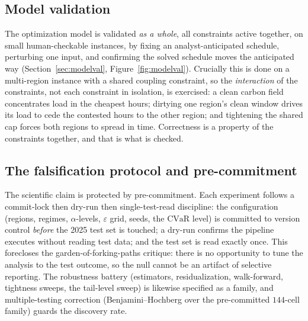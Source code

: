 \documentclass[12pt]{article}
\newcommand{\CVaR}{\mathrm{CVaR}}
\begin{document}
\subsection{Model validation}
The optimization model is validated \emph{as a whole}, all constraints active
together, on small human-checkable instances, by fixing an analyst-anticipated
schedule, perturbing one input, and confirming the solved schedule moves the
anticipated way (Section~\ref{sec:modelval}, Figure~\ref{fig:modelval}). Crucially
this is done on a multi-region instance with a shared coupling constraint, so the
\emph{interaction} of the constraints, not each constraint in isolation, is exercised:
a clean carbon field concentrates load in the cheapest hours; dirtying one region's
clean window drives its load to cede the contested hours to the other region; and
tightening the shared cap forces both regions to spread in time. Correctness is a
property of the constraints together, and that is what is checked.

\subsection{The falsification protocol and pre-commitment}
The scientific claim is protected by pre-commitment. Each experiment follows a
commit-lock then dry-run then single-test-read discipline: the configuration (regions,
regimes, $\alpha$-levels, $\varepsilon$ grid, seeds, the $\CVaR$ level) is committed
to version control \emph{before} the 2025 test set is touched; a dry-run confirms the
pipeline executes without reading test data; and the test set is read exactly once.
This forecloses the garden-of-forking-paths critique: there is no opportunity to tune
the analysis to the test outcome, so the null cannot be an artifact of selective
reporting. The robustness battery (estimators, residualization, walk-forward,
tightness sweeps, the tail-level sweep) is likewise specified as a family, and
multiple-testing correction (Benjamini--Hochberg over the pre-committed $144$-cell
family) guards the discovery rate.
\end{document}
